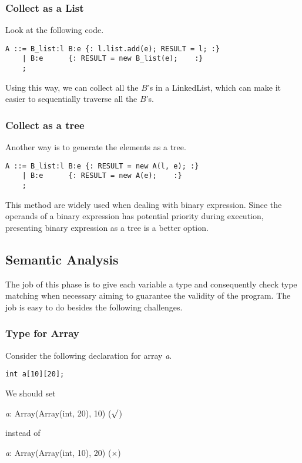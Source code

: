 \documentclass[journal]{IEEEtran}
\begin{document}
\subsubsection{Collect as a List} Look at the following code.

\begin{scriptsize}
\begin{lstlisting}
A ::= B_list:l B:e {: l.list.add(e); RESULT = l; :}
    | B:e	   {: RESULT = new B_list(e);	 :}
    ;
\end{lstlisting}
\end{scriptsize}
Using this way, we can collect all the $B$'s in a LinkedList, which can make it easier to sequentially traverse all the $B$'s.

\subsubsection{Collect as a tree} Another way is to generate the elements as a tree.
\begin{scriptsize}
\begin{lstlisting}
A ::= B_list:l B:e {: RESULT = new A(l, e); :}
    | B:e	   {: RESULT = new A(e);    :}
    ;
\end{lstlisting}
\end{scriptsize}
This method are widely used when dealing with binary expression. Since the operands of a binary expression has potential priority during execution, presenting binary expression as a tree is a better option.

\subsection{Semantic Analysis}

The job of this phase is to give each variable a type and consequently check type matching when necessary aiming to guarantee the validity of the program. The job is easy to do besides the following challenges.

\subsubsection{Type for Array} 
Consider the following declaration for array \textit{a}.
\begin{center}
\texttt{int a[10][20];}
\end{center}
We should set 
\begin{center}
\textit{a}: Array(Array(int, 20), 10) ($\surd$)
\end{center}
instead of
\begin{center}
\textit{a}: Array(Array(int, 10), 20) ($\times$)
\end{center}
\end{document}
